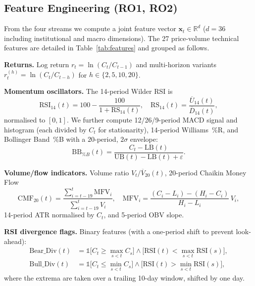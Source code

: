 \subsection{Feature Engineering (RO1, RO2)}
\label{subsec:features}

From the four streams we compute a joint feature vector
$\mathbf{x}_t \in \mathbb{R}^{d}$ ($d = 36$ including institutional and macro
dimensions). The 27 price-volume technical features are detailed in
Table~\ref{tab:features} and grouped as follows.

\textbf{Returns.} Log return $r_t = \ln(C_t/C_{t-1})$ and multi-horizon
variants $r_t^{(h)} = \ln(C_t/C_{t-h})$ for $h \in \{2,5,10,20\}$.

\textbf{Momentum oscillators.} The 14-period Wilder RSI is
\begin{equation}
\mathrm{RSI}_{14}(t) = 100 - \frac{100}{1+\mathrm{RS}_{14}(t)},\quad
\mathrm{RS}_{14}(t) = \frac{\overline{U}_{14}(t)}{\overline{D}_{14}(t)},
\label{eq:rsi}
\end{equation}
normalised to $[0,1]$. We further compute 12/26/9-period MACD signal and
histogram (each divided by $C_t$ for stationarity), 14-period Williams~\%R,
and Bollinger Band~\%B with a $20$-period, $2\sigma$ envelope:
\begin{equation}
\mathrm{BB}_{\%B}(t) = \frac{C_t - \mathrm{LB}(t)}{\mathrm{UB}(t)-\mathrm{LB}(t)+\varepsilon}.
\label{eq:bbpctb}
\end{equation}

\textbf{Volume/flow indicators.} Volume ratio $V_t/\overline{V}_{20}(t)$,
20-period Chaikin Money Flow
\begin{equation}
\mathrm{CMF}_{20}(t)
  = \frac{\sum_{i=t-19}^{t}\mathrm{MFV}_i}{\sum_{i=t-19}^{t}V_i},\quad
\mathrm{MFV}_i = \frac{(C_i-L_i)-(H_i-C_i)}{H_i-L_i}\,V_i,
\label{eq:cmf}
\end{equation}
14-period ATR normalised by $C_t$, and 5-period OBV slope.

\textbf{RSI divergence flags.} Binary features (with a one-period shift to
prevent look-ahead):
\begin{align}
\mathrm{Bear\_Div}(t) &= \mathbb{1}\bigl[C_t \geq \textstyle\max_{s<t}C_s\bigr]
  \wedge \bigl[\mathrm{RSI}(t) < \textstyle\max_{s<t}\mathrm{RSI}(s)\bigr],
  \label{eq:beardiv} \\
\mathrm{Bull\_Div}(t) &= \mathbb{1}\bigl[C_t \leq \textstyle\min_{s<t}C_s\bigr]
  \wedge \bigl[\mathrm{RSI}(t) > \textstyle\min_{s<t}\mathrm{RSI}(s)\bigr],
  \label{eq:divflags}
\end{align}
where the extrema are taken over a trailing 10-day window, shifted by one day.

